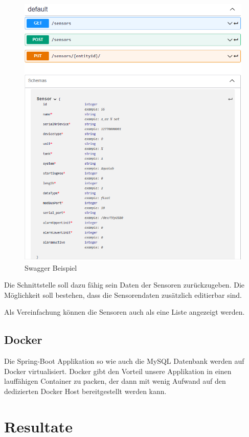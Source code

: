 \documentclass[a4paper]{article}
\begin{document}
	\begin{figure}[h]
		\centering
		\includegraphics[scale=0.4]{Swagger}
		\caption{Swagger Beispiel}
		\label{fig:Swagger}
	\end{figure}

	Die Schnittstelle soll dazu fähig sein Daten der Sensoren zurückzugeben. Die Möglichkeit soll bestehen, dass die Sensorendaten zusätzlich editierbar sind.
	
	Als Vereinfachung können die Sensoren auch als eine Liste angezeigt werden.
	
	\subsection{Docker}
	Die Spring-Boot Applikation so wie auch die MySQL Datenbank werden auf Docker virtualisiert. Docker gibt den Vorteil unsere Applikation in einen lauffähigen Container zu packen, der dann mit wenig Aufwand auf den dedizierten Docker Host bereitgestellt werden kann.
	
	\section{Resultate}
\end{document}
